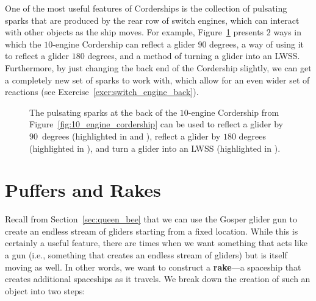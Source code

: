 One of the most useful features of Corderships is the collection of pulsating sparks that are produced by the rear row of switch engines, which can interact with other objects as the ship moves. For example, Figure~\ref{fig:cordership_reflections} presents $2$ ways in which the $10$-engine Cordership can reflect a glider $90$ degrees, a way of using it to reflect a glider $180$ degrees, and a method of turning a glider into an LWSS. Furthermore, by just changing the back end of the Cordership slightly, we can get a completely new set of sparks to work with, which allow for an even wider set of reactions (see Exercise~\ref{exer:switch_engine_back}).

\begin{figure}[!htb]
	\centering{}
	\caption{The pulsating sparks at the back of the $10$-engine Cordership from Figure~\ref{fig:10_engine_cordership} can be used to reflect a glider by $90$~degrees (highlighted in  and ), reflect a glider by $180$ degrees (highlighted in ), and turn a glider into an LWSS (highlighted in ).}\label{fig:cordership_reflections}
\end{figure}


\section{Puffers and Rakes}\label{sec:rakes}

Recall from Section~\ref{sec:queen_bee} that we can use the Gosper glider gun to create an endless stream of gliders starting from a fixed location. While this is certainly a useful feature, there are times when we want something that acts like a gun (i.e., something that creates an endless stream of gliders) but is itself moving as well. In other words, we want to construct a \textbf{rake}---a spaceship that creates additional spaceships as it travels. We break down the creation of such an object into two steps:\smallskip

